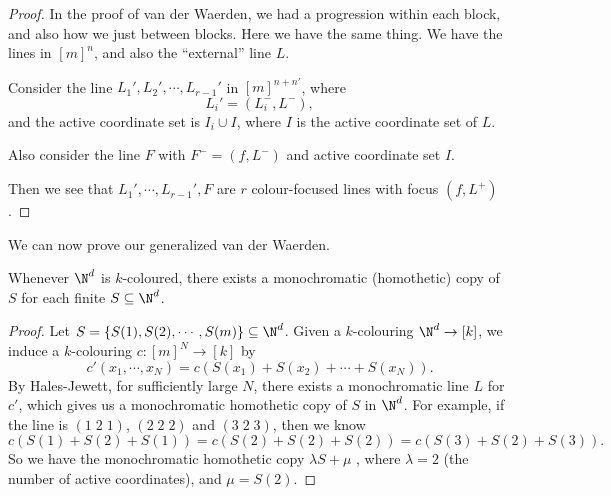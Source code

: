 \documentclass[a4paper]{article}
\begin{document}
\begin{proof}
  In the proof of van der Waerden, we had a progression within each block, and also how we just between blocks. Here we have the same thing. We have the lines in $[m]^n$, and also the ``external'' line $L$.
  \begin{center}
  \end{center}
  Consider the line $L_1', L_2', \cdots, L_{r - 1}'$ in $[m]^{n + n'}$, where
  \[
    L_i' = (L_i^-, L^-),
  \]
  and the active coordinate set is $I_i \cup I$, where $I$ is the active coordinate set of $L$.

  Also consider the line $F$ with $F^- = (f, L^-)$ and active coordinate set $I$.

  Then we see that $L_1', \cdots, L_{r - 1}', F$ are $r$ colour-focused lines with focus $(f, L^+)$.
\end{proof}

We can now prove our generalized van der Waerden.
\begin{thm}[Gallai]
  Whenever $\N^d$ is $k$-coloured, there exists a monochromatic (homothetic) copy of $S$ for each finite $S \subseteq \N^d$.
\end{thm}

\begin{proof}
  Let $S = \{S(1), S(2), \cdots, S(m)\} \subseteq \N^d$. Given a $k$-colouring $\N^d \to [k]$, we induce a $k$-colouring $c: [m]^N \to [k]$ by
  \[
    c'(x_1, \cdots, x_N) = c(S(x_1) + S(x_2) + \cdots + S(x_N)).
  \]
  By Hales-Jewett, for sufficiently large $N$, there exists a monochromatic line $L$ for $c'$, which gives us a monochromatic homothetic copy of $S$ in $\N^d$. For example, if the line is $(1\; 2\; 1)$, $(2\; 2\; 2)$ and $(3\; 2\; 3)$, then we know
  \[
    c(S(1) + S(2) + S(1)) = c(S(2) + S(2) + S(2)) = c(S(3) + S(2) + S(3)).
  \]
  So we have the monochromatic homothetic copy $\lambda S + \mu$ , where $\lambda = 2$ (the number of active coordinates), and $\mu = S(2)$.
\end{proof}
\end{document}

